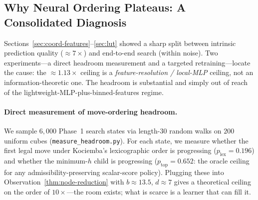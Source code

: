 \documentclass[graybox]{svmult}
\begin{document}
\subsection{Why Neural Ordering Plateaus: A Consolidated Diagnosis}
\label{sec:neural-plateau}

Sections~\ref{sec:coord-features}--\ref{sec:lut} showed a sharp split between intrinsic prediction quality ($\approx$$7\times$) and end-to-end search (within noise). Two experiments---a direct headroom measurement and a targeted retraining---locate the cause: the $\approx$$1.13\times$ ceiling is a \emph{feature-resolution / local-MLP} ceiling, not an information-theoretic one. The headroom is substantial and simply out of reach of the lightweight-MLP-plus-binned-features regime.

\paragraph{Direct measurement of move-ordering headroom.}
We sample $6{,}000$ Phase~1 search states via length-$30$ random walks on $200$ uniform cubes (\texttt{measure\_headroom.py}). For each state, we measure whether the first legal move under Kociemba's lexicographic order is progressing ($p_{\text{lex}} = 0.196$) and whether the minimum-$h$ child is progressing ($p_{\text{top}} = 0.652$: the oracle ceiling for any admissibility-preserving scalar-score policy). Plugging these into Observation~\ref{thm:node-reduction} with $b \approx 13.5$, $d \approx 7$ gives a theoretical ceiling on the order of $10\times$---the room exists; what is scarce is a learner that can fill it.
\end{document}
